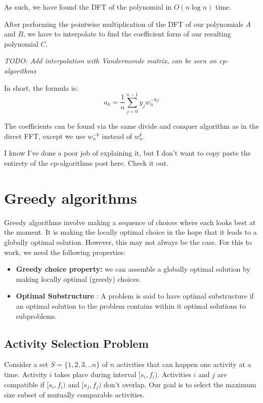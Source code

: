 \documentclass[12pt,letterpaper]{article}
\theoremstyle{definition}
\begin{document}
As such, we have found the DFT of the polynomial in $O(n \log n)$ time.

After performing the pointwise multiplication of the DFT of our polynomials $A$ and $B$, we have to interpolate to find the coefficient form of our resulting polynomial $C$.

\textit{TODO: Add interpolation with Vandermonde matrix, can be seen on cp-algorithms}

In short, the formula is:
\[a_k = \frac{1}{n} \sum_{j=0}^{n-1} y_j w_n^{-kj}\]

The coefficients can be found via the same divide and conquer algorithm as in the direct FFT, except we use $w_n^{-k}$ instead of $w_n^k$.

I know I've done a poor job of explaining it, but I don't want to copy paste the entirety of the cp-algorithms post here. Check it out.

\section{Greedy algorithms}

Greedy algorithms involve making a sequence of choices where each looks best at the moment. It is making the locally optimal choice in the hope that it leads to a globally optimal solution. However, this may not always be the case. For this to work, we need the following properties:

\begin{itemize}
  \item \textbf{Greedy choice property:} we can assemble a globally optimal solution by making locally optimal (greedy) choices.
  \item \textbf{Optimal Substructure} : A problem is said to have optimal substructure if an optimal solution to the problem contains within it optimal solutions to subproblems.
\end{itemize}

\subsection{Activity Selection Problem}

Consider a set $S = \{1,2,3,..n\}$ of $n$ activities that can happen one activity at a time. Activity $i$ takes place during interval $[s_i,f_i)$. Activities $i$ and $j$ are compatible if $[s_i,f_i)$ and $[s_j,f_j)$ don't overlap. Our goal is to select the maximum size subset of mutually comparable activities.
\end{document}
